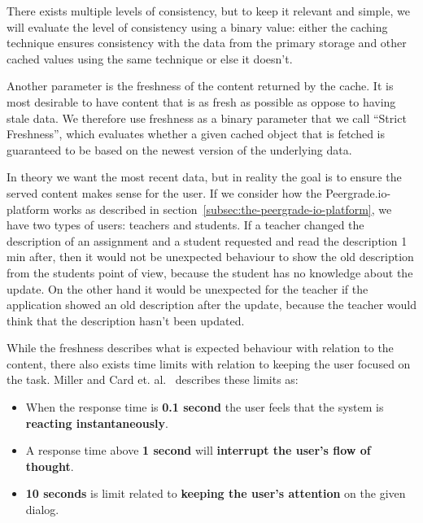 There exists multiple levels of consistency, but to keep it relevant and simple, we will evaluate the level of consistency using a binary value: either the caching technique ensures consistency with the data from the primary storage and other cached values using the same technique or else it doesn't.


Another parameter is the freshness of the content returned by the cache. It is most desirable to have content that is as fresh as possible as oppose to having stale data. We therefore use freshness as a binary parameter that we call ``Strict Freshness'', which evaluates whether a given cached object that is fetched is guaranteed to be based on the newest version of the underlying data.

In theory we want the most recent data, but in reality the goal is to ensure the served content makes sense for the user. If we consider how the Peergrade.io-platform works as described in section~\ref{subsec:the-peergrade-io-platform}, we have two types of users: teachers and students. If a teacher changed the description of an assignment and a student requested and read the description 1 min after, then it would not be unexpected behaviour to show the old description from the students point of view, because the student has no knowledge about the update. On the other hand it would be unexpected for the teacher if the application showed an old description after the update, because the teacher would think that the description hasn't been updated.


While the freshness describes what is expected behaviour with relation to the content, there also exists time limits with relation to keeping the user focused on the task. Miller and Card et. al.~\cite{paper:miller-response-time-limit, paper:card-response-time-limit} describes these limits as:

\begin{itemize}
  \item When the response time is \textbf{0.1 second} the user feels that the system is \textbf{reacting instantaneously}.
  \item A response time above \textbf{1 second} will \textbf{interrupt the user's flow of thought}.
  \item \textbf{10 seconds} is limit related to \textbf{keeping the user's attention} on the given dialog.
\end{itemize}

